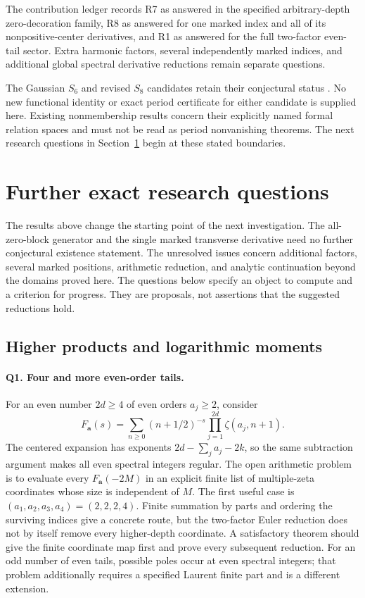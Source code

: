 \documentclass[11pt,letterpaper]{article}
\numberwithin{equation}{section}
\theoremstyle{plain}
\theoremstyle{definition}
\theoremstyle{remark}
\begin{document}
The contribution ledger records R7 as answered in the specified
arbitrary-depth zero-decoration family, R8 as answered for one marked
index and all of its nonpositive-center derivatives, and R1 as answered
for the full two-factor even-tail sector.  Extra harmonic factors,
several independently marked indices, and additional global spectral
derivative reductions remain separate questions.

The Gaussian $S_6$ and revised $S_8$ candidates retain their
conjectural status \cite{Repository,IncomingParity}.  No new functional
identity or exact period certificate for either candidate is supplied
here.  Existing nonmembership results concern their explicitly named
formal relation spaces and must not be read as period nonvanishing
theorems.  The next research questions in
Section~\ref{research:section} begin at these stated boundaries.


\section{Further exact research questions}
\label{research:section}

The results above change the starting point of the next investigation.
The all-zero-block generator and the single marked transverse derivative
need no further conjectural existence statement. The unresolved issues
concern additional factors, several marked positions, arithmetic
reduction, and analytic continuation beyond the domains proved here.
The questions below specify an object to compute and a criterion for
progress. They are proposals, not assertions that the suggested
reductions hold.

\subsection{Higher products and logarithmic moments}

\paragraph{Q1. Four and more even-order tails.}
For an even number $2d\geq4$ of even orders $a_j\geq2$, consider
\[
 F_{\boldsymbol a}(s)=\sum_{n\geq0}(n+1/2)^{-s}
                         \prod_{j=1}^{2d}\zeta(a_j,n+1).
\]
The centered expansion has exponents
$2d-\sum_j a_j-2k$, so the same subtraction argument makes all even
spectral integers regular. The open arithmetic problem is to evaluate
every $F_{\boldsymbol a}(-2M)$ in an explicit finite list of
multiple-zeta coordinates whose size is independent of $M$.
The first useful case is $(a_1,a_2,a_3,a_4)=(2,2,2,4)$.
Finite summation by parts and ordering the surviving indices give a
concrete route, but the two-factor Euler reduction does not by itself
remove every higher-depth coordinate. A satisfactory theorem should
give the finite coordinate map first and prove every subsequent
reduction. For an odd number of even tails, possible poles occur at
even spectral integers; that problem additionally requires a specified
Laurent finite part and is a different extension.
\end{document}
